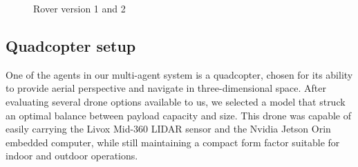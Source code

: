 \documentclass[11pt]{article}
\begin{document}
        \begin{figure}[h!]
            \centering 
            \caption{Rover version 1 and 2}
        \end{figure}



    \subsection{Quadcopter setup}
            

            One of the agents in our multi-agent system is a quadcopter, chosen for its ability to provide aerial perspective and navigate in three-dimensional space. After evaluating several drone options available to us, we selected a model that struck an optimal balance between payload capacity and size. This drone was capable of easily carrying the Livox Mid-360 LIDAR sensor and the Nvidia Jetson Orin embedded computer, while still maintaining a compact form factor suitable for indoor and outdoor operations.
\end{document}
